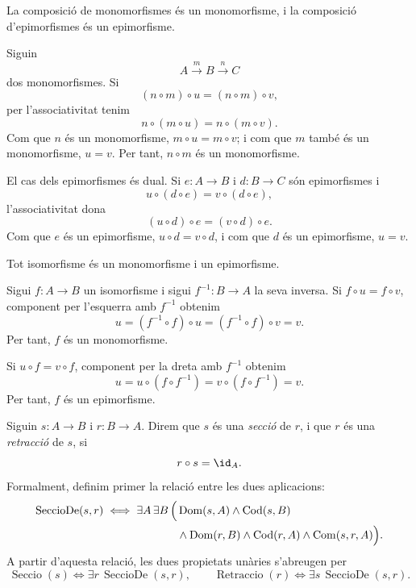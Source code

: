 \begin{proposicio}\label{prop:composicio-mono-epi}
La composició de monomorfismes és un monomorfisme, i la composició d'epimorfismes és un epimorfisme.
\end{proposicio}

\begin{prova}
Siguin
\[
A\xrightarrow{m}B\xrightarrow{n}C
\]
dos monomorfismes. Si
\[
(n\circ m)\circ u=(n\circ m)\circ v,
\]
per l'associativitat tenim
\[
n\circ(m\circ u)=n\circ(m\circ v).
\]
Com que \(n\) és un monomorfisme, \(m\circ u=m\circ v\); i com que \(m\) també és un monomorfisme, \(u=v\). Per tant, \(n\circ m\) és un monomorfisme.

El cas dels epimorfismes és dual. Si \(e:A\to B\) i \(d:B\to C\) són epimorfismes i
\[
u\circ(d\circ e)=v\circ(d\circ e),
\]
l'associativitat dona
\[
(u\circ d)\circ e=(v\circ d)\circ e.
\]
Com que \(e\) és un epimorfisme, \(u\circ d=v\circ d\), i com que \(d\) és un epimorfisme, \(u=v\).
\end{prova}

\begin{proposicio}\label{prop:isomorfisme-mono-epi}
Tot isomorfisme és un monomorfisme i un epimorfisme.
\end{proposicio}

\begin{prova}
Sigui \(f:A\to B\) un isomorfisme i sigui \(f^{-1}:B\to A\) la seva inversa. Si \(f\circ u=f\circ v\), component per l'esquerra amb \(f^{-1}\) obtenim
\[
u=(f^{-1}\circ f)\circ u=(f^{-1}\circ f)\circ v=v.
\]
Per tant, \(f\) és un monomorfisme.

Si \(u\circ f=v\circ f\), component per la dreta amb \(f^{-1}\) obtenim
\[
u=u\circ(f\circ f^{-1})=v\circ(f\circ f^{-1})=v.
\]
Per tant, \(f\) és un epimorfisme.
\end{prova}

\begin{definicio}\label{def:seccio-retraccio}
Siguin \(s:A\to B\) i \(r:B\to A\). Direm que \(s\) és una \emph{secció} de \(r\), i que \(r\) és una \emph{retracció} de \(s\), si
\[
r\circ s=\id_A.
\]
Formalment, definim primer la relació entre les dues aplicacions:
\[
\begin{aligned}
\operatorname{SeccioDe}(s,r)
\iff
\exists A\,\exists B\,\Bigl(&
\operatorname{Dom}(s,A)\land\operatorname{Cod}(s,B)
\\
&{}\land\operatorname{Dom}(r,B)\land\operatorname{Cod}(r,A)
\land\operatorname{Com}(s,r,A)
\Bigr).
\end{aligned}
\]
A partir d'aquesta relació, les dues propietats unàries s'abreugen per
\[
\operatorname{Seccio}(s)
\iff
\exists r\,\operatorname{SeccioDe}(s,r),
\qquad
\operatorname{Retraccio}(r)
\iff
\exists s\,\operatorname{SeccioDe}(s,r).
\]
\end{definicio}

